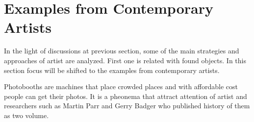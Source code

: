






%
%
\section{Examples from Contemporary Artists}
In the light of discussions at previous section, some of the main strategies and approaches of artist are analyzed. First one is related with found objects. In this section focus will be shifted to the examples from contemporary artists.



Photobooths are machines that place crowded places and with affordable cost people can get their photos. It is a pheonema that attract attention of artist and researchers such as Martin Parr and Gerry Badger who published history of them as two volume.

